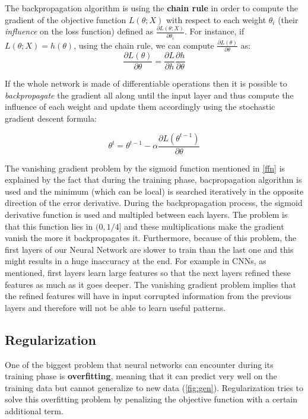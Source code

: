 \documentclass[master, tikz, final,11pt, dvipdfmx]{iscs-thesis}
\begin{document}
The backpropagation algorithm is using the \textbf{chain rule} in order to compute the gradient of the objective function $L(\theta; X)$ with respect to each weight $\theta_i$ (their \textit{influence} on the loss function) defined as $\frac{\partial L(\theta; X)}{\partial \theta_i}$. For instance, if $L(\theta; X) = h(\theta)$, using the chain rule, we can compute $\frac{\partial L(\theta)}{\partial \theta}$ as:
\[
\frac{\partial L(\theta)}{\partial \theta} = \frac{\partial L}{\partial h} \frac{\partial h}{\partial \theta}
\]

If the whole network is made of differentiable operations then it is possible to \textit{backpropagate} the gradient all along until the input layer and thus compute the influence of each weight and update them accordingly using the stochastic gradient descent formula:

 \[
\theta^t = \theta^{t-1} - \alpha \frac{\partial L(\theta^{t-1})}{\partial \theta}
 \]

The vanishing gradient problem by the sigmoid function mentioned in \autoref{ffn} is explained by the fact that during the training phase, bacpropagation algorithm is used and the minimum (which can be local) is searched iteratively in the opposite direction of the error derivative. During the backpropagation process, the sigmoid derivative function is used and multipled between each layers. The problem is that this function lies in $(0, 1/4]$ and these multiplications make the gradient vanish the more it backpropagates it.
Furthermore, because of this problem, the first layers of our Neural Network are slower to train than the last one and this might results in a huge inaccuracy at the end. For example in CNNs, as mentioned, first layers learn large features so that the next layers refined these features as much as it goes deeper. The vanishing gradient problem implies that the refined features will have in input corrupted information from the previous layers and therefore will not be able to learn useful patterns.

\subsection{Regularization}

One of the biggest problem that neural networks can encounter during its training phase is \textbf{overfitting}, meaning that it can predict very well on the training data but cannot generalize to new data (\autoref{fig:gen}). Regularization tries to solve this overfitting problem by penalizing the objective function with a certain additional term.
\end{document}
